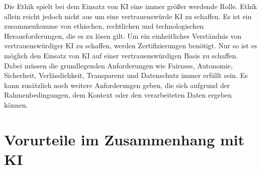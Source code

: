 \begin{onehalfspace}
        Die Ethik spielt bei dem Einsatz von \ac*{KI} eine immer größer werdende Rolle. Ethik allein reicht jedoch nicht aus um eine vertrauenswürde \ac*{KI} zu schaffen. Es ist ein zusammenkomme von ethischen, rechtlichen und technologischen Herausforderungen, die es zu lösen gilt. Um ein einheitliches Verständnis von vertrauenswürdiger \ac*{KI} zu schaffen, werden Zertifizierungen benötigt. Nur so ist es möglich den Einsatz von \ac*{KI} auf einer vertrauenswürdigen Basis zu schaffen. Dabei müssen die grundlegenden Anforderungen wie Fairness, Autonomie, Sicherheit, Verlässlichkeit, Transparenz und Datenschutz immer erfüllt sein. Es kann zusätzlich noch weitere Anforderungen geben, die sich aufgrund der Rahmenbedingungen, dem Kontext oder den verarbeiteten Daten ergeben können.\cite{Cremers2019}\cite{Hagendorff2020}

    \newpage
    \section{Vorurteile im Zusammenhang mit \ac{KI}}
    \label{subsec:KIundbias}

\end{onehalfspace}
